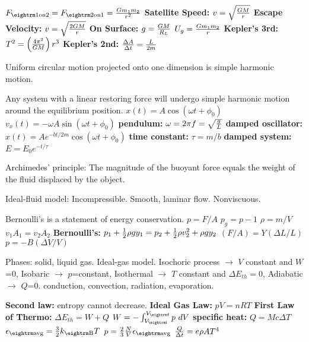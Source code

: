 {
$F_{\rm 1 on 2}=F_{\rm 2 on 1}={Gm_1m_2 \over r^2}$\quad
{\bf Satellite Speed:} $ v=\sqrt{GM\over r}$\quad
{\bf Escape Velocity:} $ v=\sqrt{2GM\over r}$\quad
{\bf On Surface:} $ g={GM\over R_L}$\quad
$ U_g={Gm_1m_2 \over r}$\quad
{\bf Kepler's 3rd:} $ T^2=\left(4\pi^2 \over GM \right)r^3$\quad
{\bf Kepler's 2nd:} $ {\Delta A \over\Delta t} = {L \over 2m}$\quad


Uniform circular motion projected onto one dimension is simple harmonic motion.

Any system with a linear restoring force will undergo simple harmonic motion around the equilibrium position.
$x(t) = A\cos{(\omega t + \phi_0)}$\quad
$v_x(t) = -\omega A\sin{(\omega t + \phi_0)}$\quad
{\bf pendulum:} $ \omega = 2\pi f = \sqrt{g \over L}$\quad
{\bf damped oscillator:} $ x(t) = Ae^{-bt/2m}\cos(\omega t + \phi_0)$\quad
{\bf time constant:} $ \tau = m/b$\quad
{\bf damped system:} $ E = E_0e^{-t/\tau}$\quad


Archimedes' principle: The magnitude of the buoyant force equals the weight of the fluid displaced by the object.

Ideal-fluid model: Incompressible. Smooth, laminar flow. Nonviscuous.

Bernoulli's is a statement of energy conservation.
$ p = F/A$\quad
$ p_g = p-1$\quad
$ \rho = m/V $\quad
$ v_1A_1=v_2A_2$\quad
{\bf Bernoulli's:} $ p_1+{1 \over 2}\rho g y_1 = p_2 + {1 \over 2}\rho v_2^2 + \rho gy_2$\quad
$ (F/A) = Y(\Delta L/L)$\quad
$ p = -B(\Delta V/V)$\quad


Phases: solid, liquid gas. Ideal-gas model. Isochoric process $\rightarrow$ $V$ constant and $W$=0, Isobaric $\rightarrow$ $p$=constant, Isothermal $\rightarrow$ $T$ constant and $\Delta E_{th}=0$, Adiabatic $\rightarrow$ $Q$=0. conduction, convection, radiation, evaporation. 

{\bf Second law:} entropy cannot decrease.
{\bf Ideal Gas Law:} $ pV = nRT $\quad
{\bf First Law of Thermo:} $ \Delta E_{th}= W + Q $\quad
$ W = -\int_{V_{\rm i}}^{V_{\rm f}}{p\ dV} $\quad
{\bf specific heat:} $ Q = Mc\Delta T $\quad
$ \epsilon_{\rm avg}={3 \over 2}k_{\rm B}T$\quad
$ p = {2 \over 3}{N \over V}\epsilon_{\rm avg}$\quad
${Q \over \Delta t} = e \rho A T^4$\quad

}
